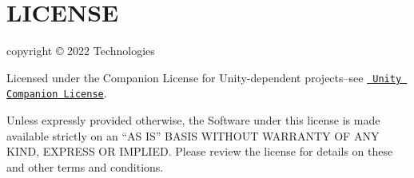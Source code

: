 \chapter{LICENSE}
\hypertarget{md__library_2_package_cache_2com_8unity_8timeline_0d1_87_86_2_l_i_c_e_n_s_e}{}\label{md__library_2_package_cache_2com_8unity_8timeline_0d1_87_86_2_l_i_c_e_n_s_e}
 copyright © 2022  Technologies

Licensed under the  Companion License for Unity-\/dependent projects--see \href{http://www.unity3d.com/legal/licenses/Unity_Companion_License}{\texttt{ Unity Companion License}}.

Unless expressly provided otherwise, the Software under this license is made available strictly on an “\+AS IS” BASIS WITHOUT WARRANTY OF ANY KIND, EXPRESS OR IMPLIED. Please review the license for details on these and other terms and conditions. 